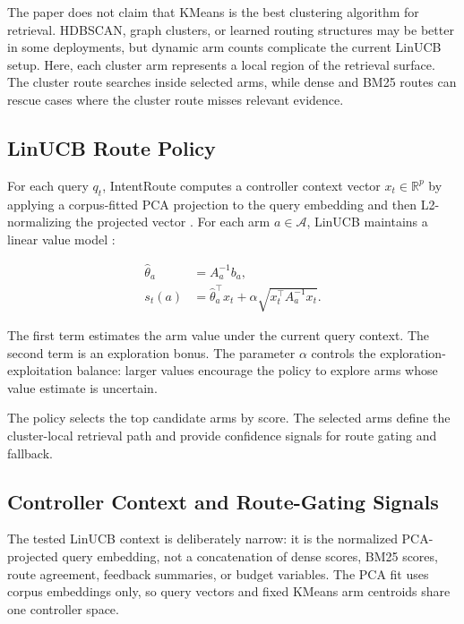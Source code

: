 The paper does not claim that KMeans is the best clustering algorithm for retrieval. HDBSCAN, graph clusters, or learned routing structures may be better in some deployments, but dynamic arm counts complicate the current LinUCB setup. Here, each cluster arm represents a local region of the retrieval surface. The cluster route searches inside selected arms, while dense and BM25 routes can rescue cases where the cluster route misses relevant evidence.

\subsection{LinUCB Route Policy}
\label{sec:04-method:linucb-route-policy}

For each query $q_t$, IntentRoute computes a controller context vector $x_t \in \mathbb{R}^{p}$ by applying a corpus-fitted PCA projection to the query embedding and then L2-normalizing the projected vector \citep{jolliffe2016pca}. For each arm $a \in \mathcal{A}$, LinUCB maintains a linear value model \citep{li2010linucb}:

\[
\begin{aligned}
\hat{\theta}_a &= A_a^{-1} b_a, \\
s_t(a) &= \hat{\theta}_a^\top x_t
        + \alpha \sqrt{x_t^\top A_a^{-1} x_t}.
\end{aligned}
\]

The first term estimates the arm value under the current query context. The second term is an exploration bonus. The parameter $\alpha$ controls the exploration-exploitation balance: larger values encourage the policy to explore arms whose value estimate is uncertain.

The policy selects the top candidate arms by score. The selected arms define the cluster-local retrieval path and provide confidence signals for route gating and fallback.

\subsection{Controller Context and Route-Gating Signals}
\label{sec:04-method:controller-context-and-route-gating-signals}

The tested LinUCB context is deliberately narrow: it is the normalized PCA-projected query embedding, not a concatenation of dense scores, BM25 scores, route agreement, feedback summaries, or budget variables. The PCA fit uses corpus embeddings only, so query vectors and fixed KMeans arm centroids share one controller space.

